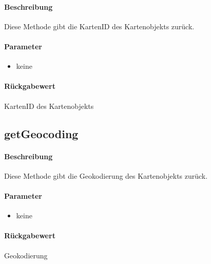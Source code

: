 \paragraph*{Beschreibung}
Diese Methode gibt die KartenID des Kartenobjekts zurück.
\paragraph*{Parameter}
\begin{itemize}
    \item keine
\end{itemize}
\paragraph*{Rückgabewert}
KartenID des Kartenobjekts

\subsection{getGeocoding}%
\paragraph*{Beschreibung}
Diese Methode gibt die Geokodierung des Kartenobjekts zurück.
\paragraph*{Parameter}
\begin{itemize}
    \item keine
\end{itemize}
\paragraph*{Rückgabewert}
Geokodierung